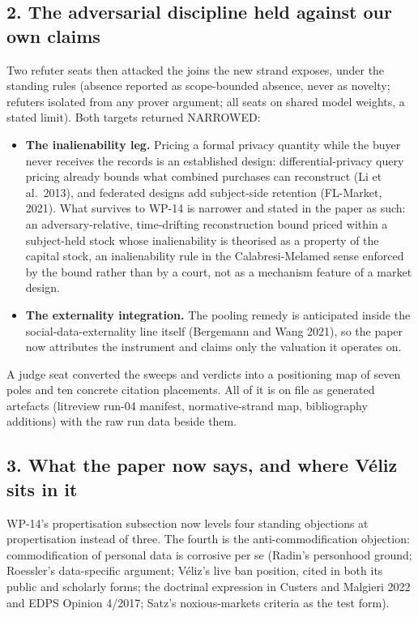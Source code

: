 \documentclass[
  11pt,
]{article}
\providecommand{\tightlist}{%
  \setlength{\itemsep}{0pt}\setlength{\parskip}{0pt}}
\begin{document}
\subsection{2. The adversarial discipline held against our own
claims}\label{the-adversarial-discipline-held-against-our-own-claims}

Two refuter seats then attacked the joins the new strand exposes, under
the standing rules (absence reported as scope-bounded absence, never as
novelty; refuters isolated from any prover argument; all seats on shared
model weights, a stated limit). Both targets returned NARROWED:

\begin{itemize}
\tightlist
\item
  \textbf{The inalienability leg.} Pricing a formal privacy quantity
  while the buyer never receives the records is an established design:
  differential-privacy query pricing already bounds what combined
  purchases can reconstruct (Li et al.~2013), and federated designs add
  subject-side retention (FL-Market, 2021). What survives to WP-14 is
  narrower and stated in the paper as such: an adversary-relative,
  time-drifting reconstruction bound priced within a subject-held stock
  whose inalienability is theorised as a property of the capital stock,
  an inalienability rule in the Calabresi-Melamed sense enforced by the
  bound rather than by a court, not as a mechanism feature of a market
  design.
\item
  \textbf{The externality integration.} The pooling remedy is
  anticipated inside the social-data-externality line itself (Bergemann
  and Wang 2021), so the paper now attributes the instrument and claims
  only the valuation it operates on.
\end{itemize}

A judge seat converted the sweeps and verdicts into a positioning map of
seven poles and ten concrete citation placements. All of it is on file
as generated artefacts (litreview run-04 manifest, normative-strand map,
bibliography additions) with the raw run data beside them.

\subsection{3. What the paper now says, and where Véliz sits in
it}\label{what-the-paper-now-says-and-where-vuxe9liz-sits-in-it}

WP-14's propertisation subsection now levels four standing objections at
propertisation instead of three. The fourth is the anti-commodification
objection: commodification of personal data is corrosive per se (Radin's
personhood ground; Roessler's data-specific argument; Véliz's live ban
position, cited in both its public and scholarly forms; the doctrinal
expression in Custers and Malgieri 2022 and EDPS Opinion 4/2017; Satz's
noxious-markets criteria as the test form).
\end{document}
